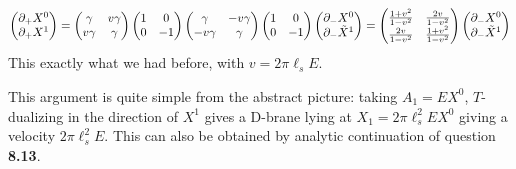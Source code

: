 \documentclass[11pt, class=article, crop=false]{standalone}
\begin{document}
\begin{enumerate}
\[\begin{aligned}
\begin{pmatrix}
		\partial_+ X^0\\
		\partial_+  X^1 
	\end{pmatrix}
	=\begin{pmatrix}
			\gamma & v \gamma\\
			v \gamma & \gamma
		\end{pmatrix}
		\begin{pmatrix}
			1 & 0\\
			0 & -1
		\end{pmatrix}
		\begin{pmatrix}
			\gamma & -v \gamma\\
			-v \gamma & \gamma
		\end{pmatrix}
		\begin{pmatrix}
			1 & 0\\
			0 & -1
		\end{pmatrix}
		\begin{pmatrix}
			\partial_- X^0\\
			\partial_- \tilde X^1
		\end{pmatrix} = \begin{pmatrix}
			\frac{1+v^2}{1-v^2} & \frac{2v}{1-v^2}\\
			\frac{2v}{1-v^2} & \frac{1+v^2}{1-v^2}
		\end{pmatrix}
		\begin{pmatrix}
			\partial_- X^0\\
			\partial_- \tilde X^1
		\end{pmatrix} 
	\end{aligned}
	\]
	This exactly what we had before, with $v = 2 \pi \ell_s E$.
	
	This argument is quite simple from the abstract picture: taking $A_1 = E X^0$, $T$-dualizing in the direction of $X^1$ gives a D-brane lying at $X_1 = 2 \pi \ell_s^2 E X^0$ giving a velocity $2 \pi \ell_s^2 E$. This can also be obtained by analytic continuation of question \textbf{8.13}. 
	

\end{enumerate}
\end{document}
